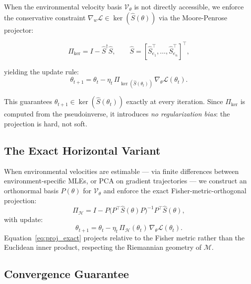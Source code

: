 \documentclass[11pt,a4paper]{article}
\newcommand{\cM}{\mathcal{M}}
\newcommand{\cH}{\mathcal{H}}
\newcommand{\cV}{\mathcal{V}}
\begin{document}
When the environmental velocity basis $\cV_\theta$ is not directly accessible, we enforce the conservative constraint $\nabla_w \mathcal{L} \in \ker(\hat S(\theta))$ via the Moore-Penrose projector:

\begin{equation}
\Pi_{\ker} = I - \hat S^\dagger \hat S, \qquad \hat S = [\hat S_{e_1}^\top, \ldots, \hat S_{e_n}^\top]^\top,
\label{eq:proj_conservative}
\end{equation}

\noindent yielding the update rule:
\begin{equation}
\theta_{t+1} = \theta_t - \eta_t\, \Pi_{\ker(\hat S(\theta_t))}\, \nabla_\theta \mathcal{L}(\theta_t).
\label{eq:crgd_conservative}
\end{equation}

This guarantees $\theta_{t+1} \in \ker(\hat S(\theta_t))$ exactly at every iteration. Since $\Pi_{\ker}$ is computed from the pseudoinverse, it introduces \emph{no regularization bias}: the projection is hard, not soft.

\subsection{The Exact Horizontal Variant}

When environmental velocities are estimable — via finite differences between environment-specific MLEs, or PCA on gradient trajectories — we construct an orthonormal basis $P(\theta)$ for $\cV_\theta$ and enforce the exact Fisher-metric-orthogonal projection:
\begin{equation}
\Pi_{\cH} = I - P\bigl(P^\top \hat S(\theta) P\bigr)^{-1} P^\top \hat S(\theta),
\label{eq:proj_exact}
\end{equation}
with update:
\begin{equation}
\theta_{t+1} = \theta_t - \eta_t\, \Pi_{\cH}(\theta_t)\, \nabla_\theta \mathcal{L}(\theta_t).
\label{eq:crgd_exact}
\end{equation}
Equation~\eqref{eq:proj_exact} projects relative to the Fisher metric rather than the Euclidean inner product, respecting the Riemannian geometry of $\cM$.

\subsection{Convergence Guarantee}
\end{document}
